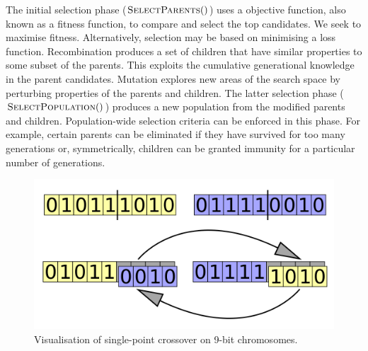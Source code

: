 The initial selection phase ($\Call{SelectParents}$) uses a objective function, also known as a fitness function, to compare and select the top candidates. We seek to maximise fitness. Alternatively, selection may be based on minimising a loss function. Recombination produces a set of children that have similar properties to some subset of the parents. This exploits the cumulative generational knowledge in the parent candidates. Mutation explores new areas of the search space by perturbing properties of the parents and children. The latter selection phase ($\Call{SelectPopulation}$) produces a new population from the modified parents and children. Population-wide selection criteria can be enforced in this phase. For example, certain parents can be eliminated if they have survived for too many generations or, symmetrically, children can be granted immunity for a particular number of generations.\\

\begin{figure}[!h]
\centering
    \includegraphics[width=.5\textwidth]{images/single-crossover.png}
    \caption{Visualisation of single-point crossover on 9-bit chromosomes. \cite{singlecrossover}}
\label{fig:single-crossover}
\end{figure}



